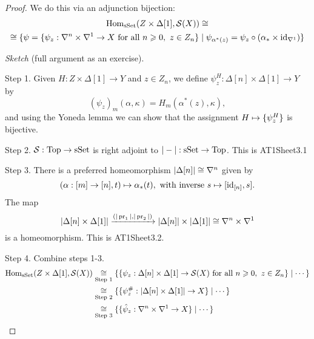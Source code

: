 \begin{proof}
We do this via an adjunction bijection:
\begin{multline*}
    \operatorname{Hom}_{\mathrm{sSet}}(Z\times\Delta[1],\mathcal{S}(X))\cong\\
    \cong\{\psi=\{\psi_z:\nabla^n\times\nabla^1\to X\text{ for all } n\geqslant0,\ z\in Z_n\}\mid\psi_{\alpha^*(z)}=\psi_z\circ(\alpha_*  \times\operatorname{id}_{\nabla^1})\}
\end{multline*}

\textit{Sketch} (full argument as an exercise).

Step 1. Given $H:Z\times\Delta[1]\to Y$ and $z\in Z_n$, we define $\psi^H_z:\Delta[n]\times\Delta[1]\to Y$ by
\[(\psi_z)_m(\alpha,\kappa)=H_m(\alpha^*(z),\kappa),\]
and using the Yoneda lemma we can show that the assignment $H\mapsto\{\psi^H_z\}$ is bijective.

Step 2. $\mathcal{S}:{\mathrm{Top}}\to{\mathrm{sSet}}$ is right adjoint to $|-|:{\mathrm{sSet}}\to{\mathrm{Top}}$. This is AT1Sheet3.1

Step 3. There is a preferred homeomorphism $|\Delta[n]|\cong\nabla^n$ given by
\[(\alpha:[m]\to[n],t)\mapsto\alpha_*(t),\text{ with inverse }s\mapsto[\operatorname{id}_{[n]},s].\] The map
\[|\Delta[n]\times\Delta[1]|\xrightarrow{(|\operatorname{pr}_1|,|\operatorname{pr}_2|)}|\Delta[n]|\times|\Delta[1]|\cong\nabla^n\times\nabla^{1}\]
is a homeomorphism. This is AT1Sheet3.2.

Step 4. Combine steps 1-3.
\begin{align*}
    \operatorname{Hom}_{\mathrm{sSet}}(Z\times\Delta[1],\mathcal{S}(X))&\underset{\text{Step 1}}{\cong}\{\{\psi_z:\Delta[n]\times\Delta[1]\to\mathcal{S}(X)\text{ for all } n\geqslant0,\ z\in Z_n\}\mid\cdots\}\\
    &\underset{\text{Step 2}}{\cong}\{\{\psi_z^\#:|\Delta[n]\times\Delta[1]|\to X\}\mid\cdots\}\\
    &\underset{\text{Step 3}}{\cong}\{\{\hat\psi_z:\nabla^n\times\nabla^{1}\to X\}\mid\cdots\}
\end{align*}

\end{proof}
